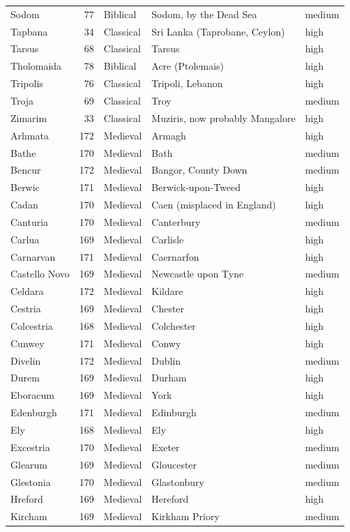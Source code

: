 \documentclass[11pt,a4paper]{article}
\begin{document}
{\begin{longtable}{p{3.2cm}rlp{6.6cm}l}
Sodom & 77 & Biblical & Sodom, by the Dead Sea & medium\\
Tapbana & 34 & Classical & Sri Lanka (Taprobane, Ceylon) & high\\
Tarsus & 68 & Classical & Tarsus & high\\
Tholomaida & 78 & Biblical & Acre (Ptolemais) & high\\
Tripolis & 76 & Classical & Tripoli, Lebanon & high\\
Troja & 69 & Classical & Troy & medium\\
Zimarim & 33 & Classical & Muziris, now probably Mangalore & high\\
Arhmata & 172 & Medieval & Armagh & high\\
Bathe & 170 & Medieval & Bath & medium\\
Bencur & 172 & Medieval & Bangor, County Down & medium\\
Berwic & 171 & Medieval & Berwick-upon-Tweed & high\\
Cadan & 170 & Medieval & Caen (misplaced in England) & high\\
Canturia & 170 & Medieval & Canterbury & medium\\
Carlua & 169 & Medieval & Carlisle & high\\
Carnarvan & 171 & Medieval & Caernarfon & high\\
Castello Novo & 169 & Medieval & Newcastle upon Tyne & medium\\
Celdara & 172 & Medieval & Kildare & high\\
Cestria & 169 & Medieval & Chester & high\\
Colcestria & 168 & Medieval & Colchester & high\\
Cunwey & 171 & Medieval & Conwy & high\\
Divelin & 172 & Medieval & Dublin & medium\\
Durem & 169 & Medieval & Durham & high\\
Eboracum & 169 & Medieval & York & high\\
Edenburgh & 171 & Medieval & Edinburgh & medium\\
Ely & 168 & Medieval & Ely & high\\
Excestria & 170 & Medieval & Exeter & medium\\
Glearum & 169 & Medieval & Gloucester & medium\\
Glestonia & 170 & Medieval & Glastonbury & medium\\
Hreford & 169 & Medieval & Hereford & high\\
Kircham & 169 & Medieval & Kirkham Priory & medium\\

\end{longtable}}
\end{document}
